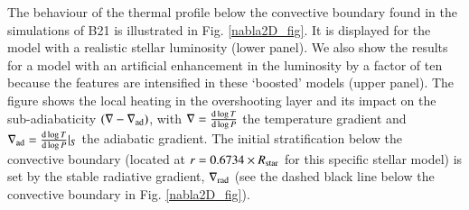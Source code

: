 \documentclass[traditabstract]{aa}
\newcommand{\3}{\ss}
\begin{document}
The behaviour of the thermal profile below the convective boundary found in the simulations of B21 is illustrated in Fig. \ref{nabla2D_fig}. It is displayed for the model with a realistic stellar luminosity (lower panel). We also show  the results for a model with an artificial enhancement in the luminosity by a factor of ten because the features are intensified in these `boosted' models (upper panel). The figure shows 
the local heating in the overshooting layer  and its impact on the sub-adiabaticity  $(\nabla - \nabla_{\rm ad})$, with $\nabla = {{\rm d} \log T \over {\rm d} \log P}$ the temperature gradient and $\nabla_{\rm ad} = {{\rm d} \log T \over {\rm d} \log P}|_S$ the adiabatic gradient. The initial stratification below the convective boundary (located at $r=0.6734 \times R_{\rm star}$ for this specific stellar model) is set by the stable radiative gradient, $\nabla_{\rm rad}$  (see the dashed black line below the convective boundary in Fig. \ref{nabla2D_fig}). 
\end{document}
